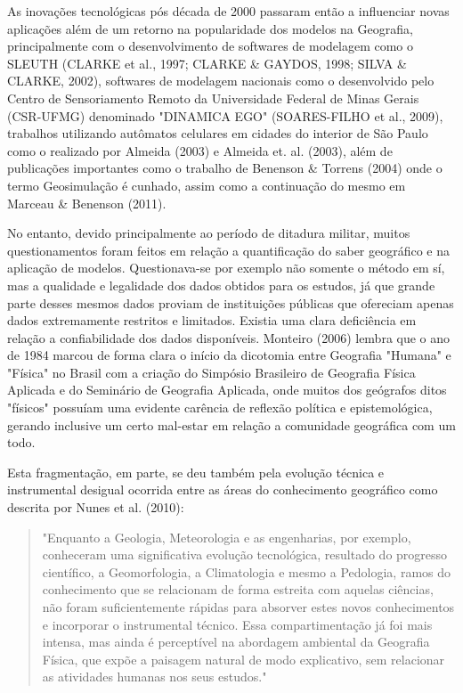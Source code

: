 As inovações tecnológicas pós década de 2000 passaram então a influenciar novas aplicações além de um retorno na popularidade dos modelos na Geografia, principalmente com o desenvolvimento de softwares de modelagem como o SLEUTH (CLARKE et al., 1997; CLARKE \& GAYDOS, 1998; SILVA \& CLARKE, 2002), softwares de modelagem nacionais como o desenvolvido pelo Centro de Sensoriamento Remoto da Universidade Federal de Minas Gerais (CSR-UFMG) denominado "DINAMICA EGO" (SOARES-FILHO et al., 2009), trabalhos utilizando autômatos celulares em cidades do interior de São Paulo como o realizado por Almeida (2003) e Almeida et. al. (2003),  além de publicações importantes como o trabalho de Benenson \& Torrens (2004) onde o termo Geosimulação é cunhado, assim como a continuação do mesmo em Marceau \& Benenson (2011).

No entanto, devido principalmente ao período de ditadura militar, muitos questionamentos foram feitos em relação a quantificação do saber geográfico e na aplicação de modelos. Questionava-se por exemplo não somente o método em sí, mas a qualidade e legalidade dos dados obtidos para os estudos, já que grande parte desses mesmos dados proviam de instituições públicas que ofereciam apenas dados extremamente restritos e limitados. Existia uma clara deficiência em relação a confiabilidade dos dados disponíveis. Monteiro (2006) lembra que o ano de 1984 marcou de forma clara o início da dicotomia entre Geografia "Humana" e "Física" no Brasil com a criação do Simpósio Brasileiro de Geografia Física Aplicada e do Seminário de Geografia Aplicada, onde muitos dos geógrafos ditos "físicos" possuíam uma evidente carência de reflexão política e epistemológica, gerando inclusive um certo mal-estar em relação a comunidade geográfica com um todo.

Esta fragmentação, em parte, se deu também pela evolução técnica e instrumental desigual ocorrida entre as áreas do conhecimento geográfico como descrita por Nunes et al. (2010):	
	
	\begin{quote}
		"Enquanto a Geologia, Meteorologia e as engenharias, por exemplo, conheceram uma significativa evolução tecnológica, resultado do progresso científico, a Geomorfologia, a Climatologia e mesmo a Pedologia, ramos do conhecimento que se relacionam de forma estreita com aquelas ciências, não foram suficientemente rápidas para absorver estes novos conhecimentos e incorporar o instrumental técnico.
		Essa compartimentação já foi mais intensa, mas ainda é perceptível na abordagem ambiental da Geografia Física, que expõe a paisagem natural de modo explicativo, sem relacionar as atividades humanas nos seus estudos."
	\end{quote}

